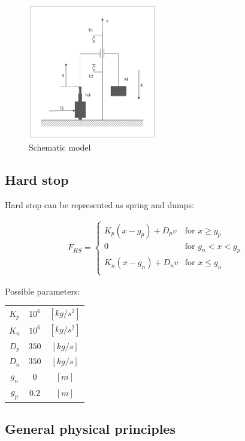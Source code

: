 \documentclass[class=article, crop=false]{standalone}
\begin{document}
\begin{figure}[h!]
    \centering
    \includegraphics[width=0.5\textwidth]{model_draw_vec.png}
    \caption{Schematic model}
    \label{fig:model_draw}
\end{figure}

\subsection{Hard stop}
Hard stop can be represented as spring and dumps:

\begin{align}
    F_{HS} =
    \begin{cases}
        K_p(x-g_p) + D_pv & \text{for } x \ge g_p \\
        0 & \text{for } g_n < x < g_p \\
        K_n(x-g_n) + D_nv & \text{for } x \le g_n \\
    \end{cases}
\end{align}


Possible parameters: \\
\begin{tabular}{ |c|c|c| }
    \hline
    $K_p$ & $10^6$ & $[kg/s^2]$  \\
    $K_n$ & $10^6$ & $[kg/s^2]$  \\
    $D_p$ & $350$  & $[kg/s]$    \\
    $D_n$ & $350$  & $[kg/s]$    \\
    $g_n$ & $0  $  & $[m]$       \\
    $g_p$ & $0.2$  & $[m]$       \\
    \hline
\end{tabular}


\subsection{General physical principles}
\end{document}
